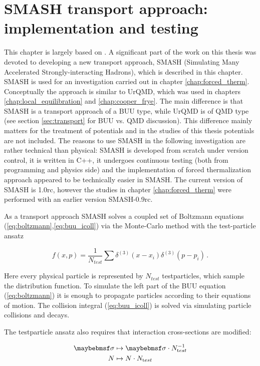 \chapter{SMASH transport approach: implementation and testing}
\label{chap:smash}

This chapter is largely based on \cite{Weil:2016zrk}.
A significant part of the work on this thesis was devoted to developing
a new transport approach, SMASH (Simulating Many Accelerated
Strongly-interacting Hadrons), which is described in this chapter.
SMASH is used for an investigation carried out in chapter \ref{chap:forced_therm}.
Conceptually the approach is similar to UrQMD, which was used in chapters
\ref{chap:local_equilibration} and \ref{chap:cooper_frye}. The main
difference is that SMASH is a transport
approach of a BUU type, while UrQMD is of QMD type (see section \ref{sec:transport}
for BUU vs. QMD discussion). This difference mainly matters for the
treatment of potentials and in the studies of this thesis potentials are not
included. The reasons to use SMASH in the following investigation are rather
technical than physical: SMASH is developed from scratch under version control,
it is written in C++, it undergoes continuous testing (both from programming and
physics side) and the implementation of forced thermalization approach appeared to be
technically easier in SMASH. The current version of SMASH is 1.0rc, however the
studies in chapter \ref{chap:forced_therm} were performed with an earlier version
SMASH-0.9rc.

As a transport approach SMASH solves a coupled set of Boltzmann
equations (\ref{eq:boltzmann},\ref{eq:buu_icoll}) via the Monte-Carlo method with
the test-particle ansatz

\begin{equation}
  \mathit{f}(x,p) = \frac{1}{N_{test}} \sum \delta^{(3)}(x - x_i) \delta^{(3)}(p - p_i) \,.
\end{equation}

Here every physical particle is represented by $N_{test}$ testparticles,
which sample the distribution function. To simulate the left part of the BUU
equation (\ref{eq:boltzmann}) it is enough to propagate particles according to their
equations of motion. The collision integral (\ref{eq:buu_icoll}) is solved via
simulating particle collisions and decays.

The testparticle ansatz also requires that interaction cross-sections are
modified:

\begin{align}
  \label{eq:testparticles_method1}
  \sigma & \mapsto \sigma \cdot \Ntest^{-1} \\
  \label{eq:testparticles_method2}
  N & \mapsto N \cdot \Ntest
\end{align}


